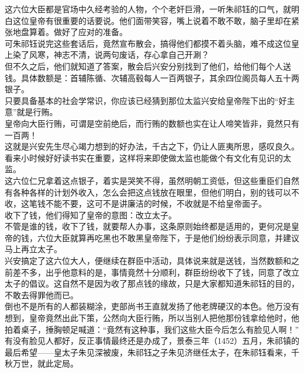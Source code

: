 \begin{multicols}{\theparacolNo}
这六位大臣都是官场中久经考验的人物，个个老奸巨滑，一听朱祁钰的口气，就明白这位皇帝有很重要的话要说。他们面带笑容，嘴上说着不敢不敢，脑子里却在紧张地盘算着。做好了应对的准备。\\

可朱祁钰说完这些套话后，竟然宣布散会，搞得他们都摸不着头脑，难不成这位皇上染了风寒，神志不清，说两句废话，存心拿自己开涮？\\

但不久之后，他们就知道了答案，散会后兴安分别找到了他们，给他们每个人送钱。具体数额是：首辅陈循、次辅高毂每人一百两银子，其余四位阁员每人五十两银子。\\

只要具备基本的社会学常识，你应该已经猜到那位太监兴安给皇帝陛下出的“好主意”就是行贿。\\

皇帝向大臣行贿，可谓是空前绝后，而行贿的数额也实在让人啼笑皆非，竟然只有一百两！\\

这就是兴安先生尽心竭力想到的好办法，千古之下，仍让人匪夷所思，感叹良久。看来小时候好好读书实在重要，这样将来即使做太监也能做个有文化有见识的太监。\\

这六位仁兄拿着这点银子，着实是哭笑不得，虽然明朝工资低，但这些重臣们自然有各种各样的计划外收入，怎么会把这点钱放在眼里，但他们明白，别的钱可以不收，这笔钱不能不要，这可不是讲廉洁的时候，不收就是不给皇帝面子。\\

收下了钱，他们得知了皇帝的意图：改立太子。\\

不管是谁的钱，收下了钱，就要帮人办事，这条原则始终都是适用的，更何况是皇帝的钱，六位大臣就算再吃黑也不敢黑皇帝陛下，于是他们纷纷表示同意，并建议马上再立太子。\\

兴安搞定了这六位大人，便继续在群臣中活动，具体说来就是送钱，当然数额和之前差不多，出乎他意料的是，事情竟然十分顺利，群臣纷纷收下了钱，同意了改立太子的倡议。这自然不是因为收了那点钱的缘故，只是大家都知道朱祁钰的目的，不敢去得罪他而已。\\

倒也不是所有的人都装糊涂，吏部尚书王直就发扬了他老牌硬汉的本色。他万没有想到，皇帝竟然出此下策，公然向大臣行贿，所以当别人把他那份钱拿给他时，他拍着桌子，捶胸顿足喊道：“竟然有这种事，我们这些大臣今后怎么有脸见人啊！”\\

有没有脸见人都好，反正事情最终还是办成了，景泰三年（1452）五月，朱祁镇的最后希望——皇太子朱见深被废，朱祁钰之子朱见济继任太子，在朱祁钰看来，千秋万世，就此定局。\\


\end{multicols}
